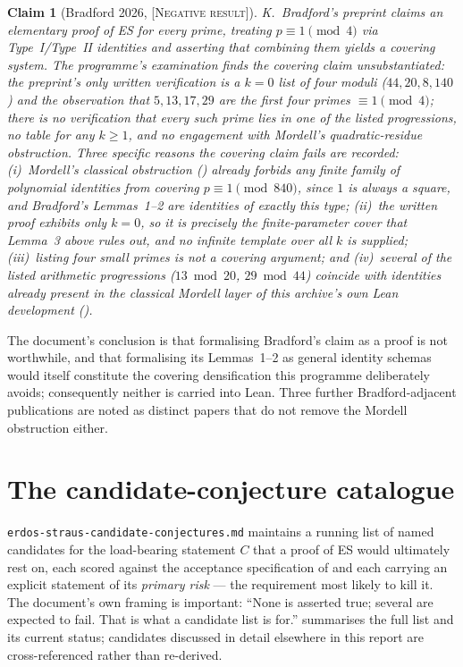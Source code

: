 \documentclass[11pt]{article}
\theoremstyle{plain}
\newtheorem{claimstmt}[theorem]{Claim}
\theoremstyle{definition}
\theoremstyle{remark}
\newcommand{\NEGATIVE}{\textcolor{negative}{\textsc{[Negative result]}}}
\renewcommand{\_}{\textunderscore\allowbreak}
\begin{document}
\begin{claimstmt}[Bradford 2026, \NEGATIVE]
K.~Bradford's preprint \cite{Bradford2026} claims an elementary proof of ES for every prime,
treating $p\equiv1\pmod4$ via Type~I/Type~II identities and asserting that combining them yields
a covering system. The programme's examination finds the covering claim unsubstantiated: the
preprint's only written verification is a $k=0$ list of four moduli ($44,20,8,140$) and the
observation that $5,13,17,29$ are the first four primes $\equiv1\pmod4$; there is no verification
that every such prime lies in one of the listed progressions, no table for any $k\ge1$, and no
engagement with Mordell's quadratic-residue obstruction. Three specific reasons the covering
claim fails are recorded: (i)~Mordell's classical obstruction () already
forbids any finite family of polynomial identities from covering $p\equiv1\pmod{840}$, since $1$
is always a square, and Bradford's Lemmas~1--2 are identities of exactly this type;
(ii)~the written proof exhibits only $k=0$, so it is precisely the finite-parameter cover that
Lemma~3 above rules out, and no infinite template over all $k$ is supplied;
(iii)~listing four small primes is not a covering argument; and (iv)~several of the listed
arithmetic progressions ($13\bmod20$, $29\bmod44$) coincide with identities already present in
the classical Mordell layer of this archive's own Lean development
().
\end{claimstmt}
The document's conclusion is that formalising Bradford's claim as a proof is not worthwhile, and
that formalising its Lemmas~1--2 as general identity schemas would itself constitute the
covering densification this programme deliberately avoids; consequently neither is carried into
Lean. Three further Bradford-adjacent publications \cite{Bradford2021,BradfordIonascu2015,Bradford2024}
are noted as distinct papers that do not remove the
Mordell obstruction either.


\section{The candidate-conjecture catalogue}
\label{sec:candidates}

\texttt{erdos-\allowbreak straus-\allowbreak candidate-\allowbreak conjectures.md} maintains a running list of named candidates for
the load-bearing statement $C$ that a proof of ES would ultimately rest on, each scored against
the acceptance specification of  and each carrying an explicit statement of its
\emph{primary risk} — the requirement most likely to kill it. The document's own framing is
important: ``None is asserted true; several are expected to fail. That is what a candidate list
is for.''  summarises the full list and its current status; candidates
discussed in detail elsewhere in this report are cross-referenced rather than re-derived.
\end{document}
